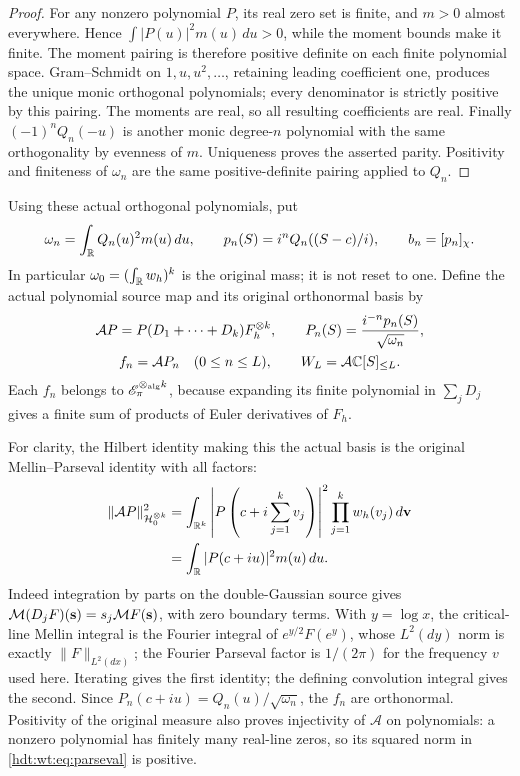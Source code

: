 \documentclass[11pt]{article}
\begin{document}
\begin{proof}
For any nonzero polynomial $P$, its real zero set is finite,
and $m>0$ almost everywhere.  Hence
$\int |P(u)|^2m(u)\,du>0$, while the moment bounds make it
finite.  The moment pairing is therefore positive definite
on each finite polynomial space.  Gram--Schmidt on
$1,u,u^2,\ldots$, retaining leading coefficient one, produces
the unique monic orthogonal polynomials; every denominator is
strictly positive by this pairing.  The moments are real,
so all resulting coefficients are real.  Finally
$(-1)^nQ_n(-u)$ is another monic degree-$n$ polynomial with
the same orthogonality by evenness of $m$.  Uniqueness proves
the asserted parity.  Positivity and finiteness of $\omega_n$
are the same positive-definite pairing applied to $Q_n$.
\end{proof}

Using these actual orthogonal polynomials, put
\[
 \omega_n=\int_\mathbb R Q_n(u)^2m(u)\,du,\qquad
 p_n(S)=i^nQ_n((S-c)/i),\qquad b_n=[p_n]_\chi.
\]
In particular $\omega_0=(\int_\mathbb R w_h)^k$ is the original mass;
it is not reset to one.  Define the actual polynomial source map
and its original orthonormal basis by
\begin{equation}\label{hdt:wt:eq:actual-source}
\begin{gathered}
 \mathcal AP=P(D_1+\cdots+D_k)F_h^{\otimes k},\qquad
 P_n(S)=\frac{i^{-n}p_n(S)}{\sqrt{\omega_n}},\\
 f_n=\mathcal AP_n\quad(0\leq n\leq L),\qquad
 W_L=\mathcal A\mathbb C[S]_{\leq L}.
\end{gathered}
\end{equation}
Each $f_n$ belongs to $\mathscr E_\pi^{\otimes_{\mathrm{alg}} k}$,
because expanding its finite polynomial in $\sum_jD_j$ gives
a finite sum of products of Euler derivatives of $F_h$.

For clarity, the Hilbert identity making this the actual basis
is the original Mellin--Parseval identity with all factors:
\begin{equation}\label{hdt:wt:eq:parseval}
 \begin{split}
 \|\mathcal AP\|_{\mathcal H_0^{\otimes k}}^2
 &=\int_{\mathbb R^k}\left|P\left(c+i\sum_{j=1}^kv_j\right)\right|^2
              \prod_{j=1}^kw_h(v_j)\,d\mathbf v\\
 &=\int_\mathbb R|P(c+iu)|^2m(u)\,du.
 \end{split}
\end{equation}
Indeed integration by parts on the double-Gaussian source gives
$\mathcal M(D_jF)(\mathbf s)=s_j\mathcal M F(\mathbf s)$, with zero
boundary terms.  With $y=\log x$, the critical-line Mellin
integral is the Fourier integral of $e^{y/2}F(e^y)$, whose
$L^2(dy)$ norm is exactly $\|F\|_{L^2(dx)}$; the Fourier
Parseval factor is $1/(2\pi)$ for the frequency $v$ used here.
Iterating gives the first identity; the defining convolution
integral gives the second.  Since $P_n(c+iu)=Q_n(u)/\sqrt{\omega_n}$,
the $f_n$ are orthonormal.  Positivity of the original measure
also proves injectivity of $\mathcal A$ on polynomials: a nonzero
polynomial has finitely many real-line zeros, so its squared
norm in \eqref{hdt:wt:eq:parseval} is positive.
\end{document}
